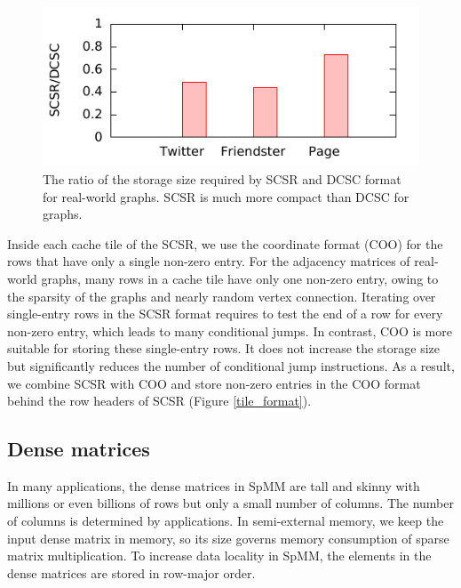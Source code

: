 \begin{figure}
	\begin{center}
		\footnotesize
		\includegraphics[scale=1]{SpMM_figs/storage.pdf}
		\caption{The ratio of the storage size required by SCSR and DCSC
			\cite{Buluc08} format for real-world graphs. SCSR is much more
		compact than DCSC for graphs.}
		\label{fig:storage}
	\end{center}
\end{figure}

Inside each cache tile of the SCSR, we use the coordinate format (COO) for
the rows that have only a single non-zero entry. For the adjacency matrices of
real-world graphs, many rows in a cache tile have only one non-zero entry,
owing to the sparsity of the graphs and nearly random vertex connection.
Iterating over single-entry rows in the SCSR format requires to test
the end of a row for every non-zero entry, which leads to many conditional jumps.
In contrast, COO is more suitable for storing these
single-entry rows. It does not increase the storage size but significantly
reduces the number of conditional jump instructions. As a result, we combine
SCSR with COO and store non-zero entries in the COO format behind the row headers
of SCSR (Figure \ref{tile_format}).


\subsection{Dense matrices}
In many applications, the dense matrices in SpMM are tall and skinny with
millions or even billions of rows but only a small number of columns.
The number of columns is determined by applications. In semi-external memory,
we keep the input dense matrix in memory, so its size governs memory consumption
of sparse matrix multiplication. To increase data locality in SpMM, the elements
in the dense matrices are stored in row-major order.

